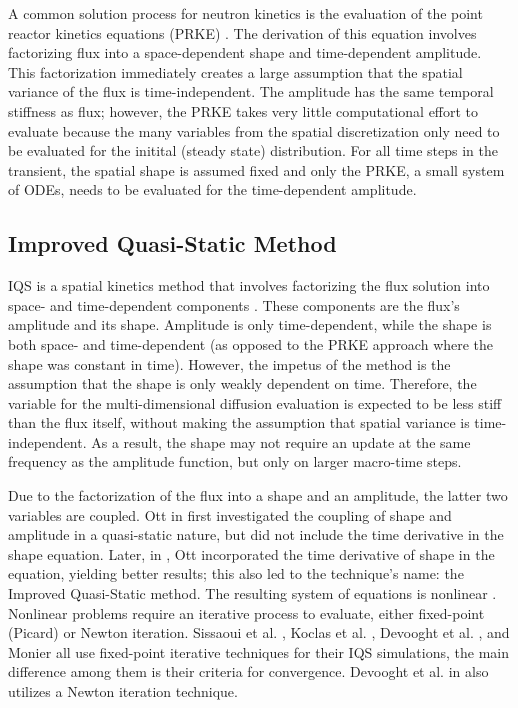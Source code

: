 A common solution process for neutron kinetics is the evaluation of the point reactor kinetics equations (PRKE) \cite{Planchard_1991}.  The derivation of this equation involves factorizing flux into a space-dependent shape and time-dependent amplitude.  This factorization immediately creates a large assumption that the spatial variance of the flux is time-independent.  The amplitude has the same temporal stiffness as flux; however, the PRKE takes very little computational effort to evaluate because the many variables from the spatial discretization only need to be evaluated for the initital (steady state) distribution. For all time steps in the transient, the spatial shape is assumed fixed and only the PRKE, a small system of ODEs, needs to be evaluated for the time-dependent amplitude.


\subsection{Improved Quasi-Static Method}

IQS is a spatial kinetics method that involves factorizing the flux solution into space- and time-dependent components \cite{Ott_1966,Dulla2008,Devooght_1984,Monier_diss,Sissaoui_1995}.  These components are the flux's amplitude and its shape. Amplitude is only time-dependent, while the shape is both space- and time-dependent (as opposed to the PRKE approach where the shape was constant in time).  However, the impetus of the method is the assumption that the shape is only weakly dependent on time. Therefore, the variable for the multi-dimensional diffusion evaluation is expected to be less stiff than the flux itself, without making the assumption that spatial variance is time-independent.  As a result, the shape may not require an update at the same frequency as the amplitude function, but only on larger macro-time steps.  

Due to the factorization of the flux into a shape and an amplitude, the latter two variables are coupled. Ott in \cite{Ott_1966} first investigated the coupling of shape and amplitude in a quasi-static nature, but did not include the time derivative in the shape equation. Later, in \cite{Ott_1969}, Ott incorporated the time derivative of shape in the equation, yielding better results; this also led to the technique's name: the Improved Quasi-Static method.  The resulting system of equations is  nonlinear \cite{Dulla2008}. Nonlinear problems require an iterative process to evaluate, either fixed-point (Picard) or Newton iteration. Sissaoui et al. \cite{Sissaoui_1995}, Koclas et al. \cite{Koclas_1996}, Devooght et al. \cite{Devooght_1984}, and Monier \cite{Monier_diss} all use fixed-point iterative techniques for their IQS simulations, the main difference among them is their criteria for convergence.  Devooght et al. in \cite{Devooght_1984} also utilizes a Newton iteration technique.

